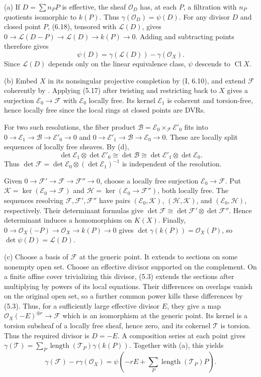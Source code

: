 (a) If $D=\sum n_PP$ is effective, the sheaf $\mathcal O_D$ has, at each $P$, a filtration with $n_P$ quotients isomorphic to $k(P)$. Thus $\gamma(\mathcal O_D)=\psi(D)$. For any divisor $D$ and closed point $P$, (6.18), tensored with $\mathcal L(D)$, gives $0\to\mathcal L(D-P)\to\mathcal L(D)\to k(P)\to0$. Adding and subtracting points therefore gives
\[\psi(D)=\gamma(\mathcal L(D))-\gamma(\mathcal O_X).\]
Since $\mathcal L(D)$ depends only on the linear equivalence class, $\psi$ descends to $\operatorname{Cl}X$.

(b) Embed $X$ in its nonsingular projective completion by (I, 6.10), and extend $\mathcal F$ coherently by . Applying (5.17) after twisting and restricting back to $X$ gives a surjection $\mathcal E_0\to\mathcal F$ with $\mathcal E_0$ locally free. Its kernel $\mathcal E_1$ is coherent and torsion-free, hence locally free since the local rings at closed points are DVRs.

For two such resolutions, the fiber product $\mathcal B=\mathcal E_0\times_{\mathcal F}\mathcal E'_0$ fits into $0\to\mathcal E_1\to\mathcal B\to\mathcal E'_0\to0$ and $0\to\mathcal E'_1\to\mathcal B\to\mathcal E_0\to0$. These are locally split sequences of locally free sheaves. By (d),
\[\det\mathcal E_1\otimes\det\mathcal E'_0\cong\det\mathcal B\cong\det\mathcal E'_1\otimes\det\mathcal E_0.\]
Thus $\det\mathcal F=\det\mathcal E_0\otimes(\det\mathcal E_1)^{-1}$ is independent of the resolution.

Given $0\to\mathcal F'\to\mathcal F\to\mathcal F''\to0$, choose a locally free surjection $\mathcal E_0\to\mathcal F$. Put $\mathcal K=\ker(\mathcal E_0\to\mathcal F)$ and $\mathcal H=\ker(\mathcal E_0\to\mathcal F'')$, both locally free. The sequences resolving $\mathcal F,\mathcal F',\mathcal F''$ have pairs $(\mathcal E_0,\mathcal K)$, $(\mathcal H,\mathcal K)$, and $(\mathcal E_0,\mathcal H)$, respectively. Their determinant formulas give $\det\mathcal F\cong\det\mathcal F'\otimes\det\mathcal F''$. Hence determinant induces a homomorphism on $K(X)$. Finally, $0\to\mathcal O_X(-P)\to\mathcal O_X\to k(P)\to0$ gives $\det\gamma(k(P))=\mathcal O_X(P)$, so $\det\psi(D)=\mathcal L(D)$.

(c) Choose a basis of $\mathcal F$ at the generic point. It extends to sections on some nonempty open set. Choose an effective divisor supported on the complement. On a finite affine cover trivializing this divisor, (5.3) extends the sections after multiplying by powers of its local equations. Their differences on overlaps vanish on the original open set, so a further common power kills these differences by (5.3). Thus, for a sufficiently large effective divisor $E$, they give a map $\mathcal O_X(-E)^{\oplus r}\to\mathcal F$ which is an isomorphism at the generic point. Its kernel is a torsion subsheaf of a locally free sheaf, hence zero, and its cokernel $\mathcal T$ is torsion. Thus the required divisor is $D=-E$. A composition series at each point gives $\gamma(\mathcal T)=\sum_P\operatorname{length}(\mathcal T_P)\gamma(k(P))$. Together with (a), this yields
\[\gamma(\mathcal F)-r\gamma(\mathcal O_X)=\psi\left(-rE+\sum_P\operatorname{length}(\mathcal T_P)P\right).\]

